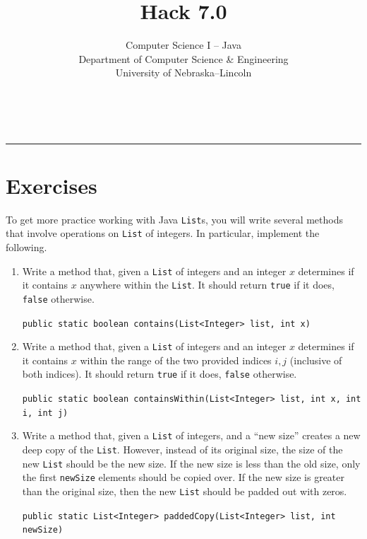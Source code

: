 \documentclass[12pt]{scrartcl}
\title{Hack 7.0}\let\Title\@title
\subtitle{Computer Science I -- Java\\
{\small
\vskip1cm
Department of Computer Science \& Engineering \\
University of Nebraska--Lincoln}
\vskip-1cm}
\date{~}
\begin{document}
\maketitle

\hrule



\section*{Exercises}

To get more practice working with Java \texttt{List}s, you 
will write several methods that involve operations on \texttt{List}
of integers. In particular, implement the following.

\begin{enumerate}

  \item Write a method that, given a \texttt{List} of integers
  and an integer $x$ determines if it contains $x$ anywhere within the 
  \texttt{List}.  It should return \texttt{true} if it 
  does, \texttt{false} otherwise.
  
  \texttt{public static boolean contains(List<Integer> list, int x)}

  \item Write a method that, given a \texttt{List} of integers
  and an integer $x$ determines if it contains $x$ within the range of 
  the two provided indices $i, j $ (inclusive of both indices).
  It should return \texttt{true} if it 
  does, \texttt{false} otherwise.

  
  \texttt{public static boolean containsWithin(List<Integer> list, int x, int i, int j)}
  
  \item Write a method that, given a \texttt{List} of integers, 
  and a ``new size'' creates a new deep copy of the \texttt{List}.  
  However, instead of its original size, the size of the new 
  \texttt{List} should be the new size.  If the new
  size is less than the old size, only the first \texttt{newSize} 
  elements should be copied over.  If the new size is greater than the original
  size, then the new \texttt{List} should be padded out with zeros.
  
  \texttt{public static List<Integer> paddedCopy(List<Integer> list, int newSize)}


\end{enumerate}
\end{document}
